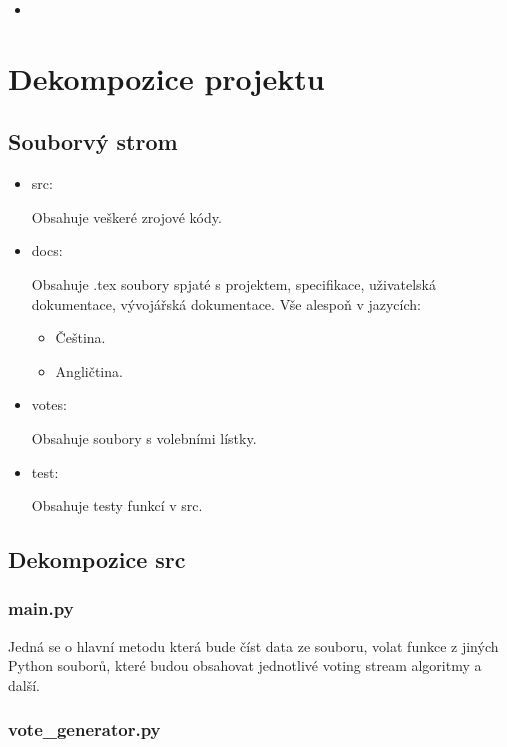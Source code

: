 \documentclass[a4paper,12pt]{report}
\begin{document}
	\begin{itemize}
		\item 
	\end{itemize}
	
	\section{Dekompozice projektu}
	
	\subsection{Souborvý strom}
	
	\begin{itemize}
		\item src:
		
		Obsahuje veškeré zrojové kódy.
		
		\item docs:
		
		Obsahuje .tex soubory spjaté s projektem, specifikace, uživatelská dokumentace, vývojářská dokumentace. Vše alespoň v jazycích:
		
		\begin{itemize}
			\item Čeština.
			\item Angličtina.
		\end{itemize}
		
		\item votes:
		
		Obsahuje soubory s volebními lístky.
		
		\item test:
		
		Obsahuje testy funkcí v src.
	\end{itemize}
	
	\subsection{Dekompozice src}
	
	\subsubsection{main.py}
	
	Jedná se o hlavní metodu která bude číst data ze souboru, volat funkce z jiných Python souborů, které budou obsahovat jednotlivé voting stream algoritmy a další.
	
	\subsubsection{vote\_generator.py}
	
\end{document}
